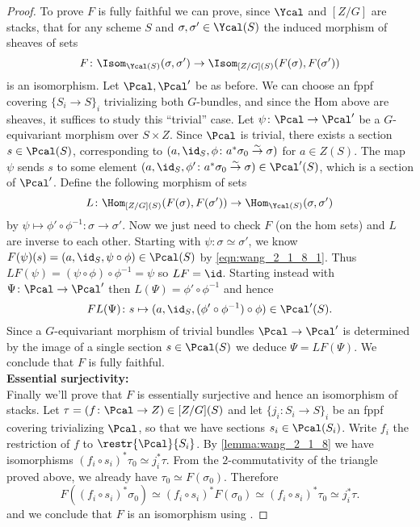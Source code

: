 \begin{proof}
                To prove $F$ is fully faithful we can prove, since $\Ycal$ and $[Z/G]$ are stacks, that for any scheme $S$ and $\sigma, \sigma' \in \Ycal(S)$ the induced morphism of sheaves of sets \[F\colon \Isom_{\Ycal(S)}(\sigma, \sigma') \to \Isom_{[Z/G](S)}(F(\sigma), F(\sigma')) \] is an isomorphism. Let $\Pcal, \Pcal'$ be as before. We can choose an fppf covering $\{S_i \to S\}_i$ trivializing both $G$-bundles, and since the Hom above are sheaves, it suffices to study this ``trivial'' case. Let $\psi\colon \Pcal \to \Pcal'$ be a $G$-equivariant morphism over $S \times Z$. Since $\Pcal$ is trivial, there exists a section $s \in \Pcal(S)$, corresponding to $(a, \id_S, \phi\colon a^*\sigma_0 \stackrel{\sim}{\to} \sigma)$ for $a \in Z(S)$. The map $\psi$ sends $s$ to some element $(a, \id_S, \phi'\colon a^*\sigma_0 \stackrel{\sim}{\to} \sigma) \in \Pcal'(S)$, which is a section of $\Pcal'$. Define the following morphism of sets \[L\colon \Hom_{[Z/G](S)}(F(\sigma), F(\sigma')) \to \Hom_{\Ycal(S)}(\sigma, \sigma') \] by $\psi \mapsto \phi' \circ \phi^{-1}\colon \sigma \to \sigma'$. Now we just need to check $F$ (on the hom sets) and $L$ are inverse to each other. Starting with $\psi\colon \sigma \simeq \sigma'$, we know $F(\psi)(s) = (a, \id_S, \psi \circ \phi) \in \Pcal(S)$ by \cref{eqn:wang_2_1_8_1}. Thus $LF(\psi) = (\psi \circ \phi) \circ \phi^{-1} = \psi$ so $LF = \id$. Starting instead with $\Psi\colon \Pcal \to \Pcal'$ then $L(\Psi) = \phi' \circ \phi^{-1}$ and hence \[FL(\Psi)\colon s \mapsto (a, \id_S, (\phi' \circ \phi^{-1}) \circ \phi) \in \Pcal'(S). \] Since a $G$-equivariant morphism of trivial bundles $\Pcal \to \Pcal'$ is determined by the image of a single section $s \in \Pcal(S)$ we deduce $\Psi = LF(\Psi)$. We conclude that $F$ is fully faithful.\\
                \textbf{Essential surjectivity:}\\
                Finally we'll prove that $F$ is essentially surjective and hence an isomorphism of stacks. Let $\tau = (f\colon \Pcal \to Z) \in [Z/G](S)$ and let $\{j_i\colon S_i \to S\}_i$ be an fppf covering trivializing $\Pcal$, so that we have sections $s_i \in \Pcal(S_i)$. Write $f_i$ the restriction of $f$ to $\restr{\Pcal}{S_i}$. By \cref{lemma:wang_2_1_8} we have isomorphisms $(f_i \circ s_i)^*\tau_0 \simeq j_i^*\tau$. From the  $2$-commutativity of the triangle proved above, we already have $\tau_0 \simeq F(\sigma_0)$. Therefore \[F((f_i \circ s_i)^*\sigma_0) \simeq (f_i \circ s_i)^*F(\sigma_0) \simeq (f_i \circ s_i)^*\tau_0 \simeq j_i^*\tau. \] and we conclude that $F$ is an isomorphism using \cite[\href{https://stacks.math.columbia.edu/tag/046N}{Lemma 046N}]{stacks-project}.
            \end{proof}
